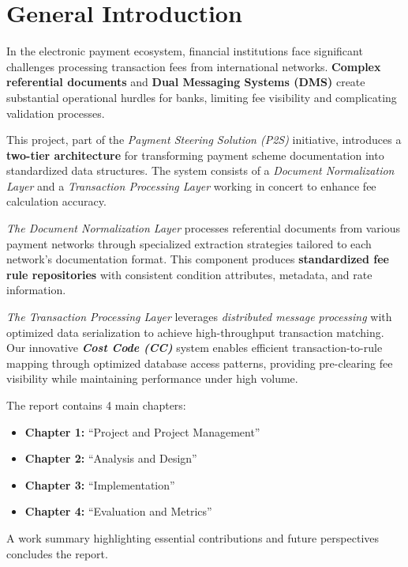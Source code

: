 \section*{General Introduction}
\begingroup
{}
In the electronic payment ecosystem, financial institutions face significant challenges processing transaction fees from international networks. \textbf{Complex referential documents} and \textbf{Dual Messaging Systems (DMS)} create substantial operational hurdles for banks, limiting fee visibility and complicating validation processes.

This project, part of the \textit{Payment Steering Solution (P2S)} initiative, introduces a \textbf{two-tier architecture} for transforming payment scheme documentation into standardized data structures. The system consists of a \textit{Document Normalization Layer} and a \textit{Transaction Processing Layer} working in concert to enhance fee calculation accuracy.

\textit{The Document Normalization Layer} processes referential documents from various payment networks through specialized extraction strategies tailored to each network's documentation format. This component produces \textbf{standardized fee rule repositories} with consistent condition attributes, metadata, and rate information.

\textit{The Transaction Processing Layer} leverages \textit{distributed message processing} with optimized data serialization to achieve high-throughput transaction matching. Our innovative \textbf{\textit{Cost Code (CC)}} system enables efficient transaction-to-rule mapping through optimized database access patterns, providing pre-clearing fee visibility while maintaining performance under high volume.

\setlength{\parindent}{0pt}
The report contains 4 main chapters:
\begin{itemize}[label={$\star$}]
\item \textbf{Chapter 1:} ``Project and Project Management''
\item \textbf{Chapter 2:} ``Analysis and Design''
\item \textbf{Chapter 3:} ``Implementation''
\item \textbf{Chapter 4:} ``Evaluation and Metrics''
\end{itemize}
\vspace{1cm}
A work summary highlighting essential contributions and future perspectives concludes the report.
\endgroup
\pagebreak
